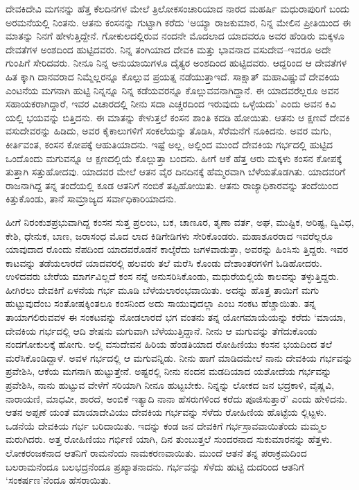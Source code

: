 ದೇವಕಿದೇವಿ ಮಗನನ್ನು ಹೆತ್ತ ಕೆಲದಿನಗಳ ಮೇಲೆ ತ್ರಿಲೋಕಸಂಚಾರಿಯಾದ ನಾರದ ಮಹರ್ಷಿ ಮಧುರಾಪುರಿಗೆ ಬಂದು ಅರಮನೆಯಲ್ಲಿ ನಿಂತನು. ಆತನು ಕಂಸನನ್ನು ಗುಟ್ಟಾಗಿ ಕರೆದು ‘ಅಯ್ಯಾ ರಾಜಕುಮಾರ, ನಿನ್ನ ಮೇಲಿನ ಪ್ರೀತಿಯಿಂದ ಈ ಮಾತನ್ನು ನಿನಗೆ ಹೇಳುತ್ತಿದ್ದೇನೆ. ಗೋಕುಲದಲ್ಲಿರುವ ನಂದನೇ ಮೊದಲಾದ ಯಾದವರೂ ಅವರ ಹೆಂಡಿರು ಮಕ್ಕಳೂ ದೇವತೆಗಳ ಅಂಶದಿಂದ ಹುಟ್ಟಿದವರು. ನಿನ್ನ ತಂಗಿಯಾದ ದೇವಕಿ ಮತ್ತು ಭಾವನಾದ ವಸುದೇವ–ಇವರೂ ಅದೇ ಗುಂಪಿಗೆ ಸೇರಿದವರು. ನೀನೂ ನಿನ್ನ ಅನುಯಾಯಿಗಳೂ ದೈತ್ಯರ ಅಂಶದಿಂದ ಹುಟ್ಟಿದವರು. ಆದ್ದರಿಂದ ಆ ದೇವತೆಗಳ ಹಿತ ಕ್ಕಾಗಿ ದಾನವರಾದ ನಿಮ್ಮೆಲ್ಲರನ್ನೂ ಕೊಲ್ಲುವ ಪ್ರಯತ್ನ ನಡೆಯುತ್ತಾಇದೆ. ಸಾಕ್ಷಾತ್ ಮಹಾವಿಷ್ಣುವೆ ದೇವಕಿಯ ಎಂಟನೆಯ ಮಗನಾಗಿ ಹುಟ್ಟಿ ನಿನ್ನನ್ನೂ ನಿನ್ನ ಕಡೆಯವರನ್ನೂ ಕೊಲ್ಲುವವನಾಗಿದ್ದಾನೆ. ಈ ಯಾದವರೆಲ್ಲರೂ ಅವನ ಸಹಾಯಕರಾಗಿದ್ದಾರೆ, ಇವರ ವಿಚಾರದಲ್ಲಿ ನೀನು ಸದಾ ಎಚ್ಚರದಿಂದ ಇರುವುದು ಒಳ್ಳೆಯದು’ ಎಂದು ಅವನ ಕಿವಿ ಯಲ್ಲಿ ಭಯವನ್ನು ಬಿತ್ತಿದನು. ಈ ಮಾತನ್ನು ಕೇಳುತ್ತಲೆ ಕಂಸನ ಶಾಂತಿ ಕದಡಿ ಹೋಯಿತು. ಆತನು ಆ ಕ್ಷಣವೆ ದೇವಕಿ ವಸುದೇವರನ್ನು ಹಿಡಿದು, ಅವರ ಕೈಕಾಲುಗಳಿಗೆ ಸಂಕಲೆಯನ್ನು ತೊಡಿಸಿ, ಸೆರೆಮನೆಗೆ ನೂಕಿದನು. ಅವರ ಮಗು, ಕೀರ್ತಿವಂತ, ಕಂಸನ ಕೋಪಕ್ಕೆ ಆಹುತಿಯಾದನು. ಇಷ್ಟೆ ಅಲ್ಲ, ಅಲ್ಲಿಂದ ಮುಂದೆ ದೇವಕಿಯ ಗರ್ಭದಲ್ಲಿ ಹುಟ್ಟಿದ ಒಂದೊಂದು ಮಗುವನ್ನೂ ಆ ಕ್ಷಣದಲ್ಲಿಯೆ ಕೊಲ್ಲುತ್ತಾ ಬಂದನು. ಹೀಗೆ ಆಕೆ ಹೆತ್ತ ಆರು ಮಕ್ಕಳು ಕಂಸನ ಕೋಪಕ್ಕೆ ತುತ್ತಾಗಿ ಸತ್ತುಹೋದವು. ಯಾದವರ ಮೇಲೆ ಆತನ ವೈರ ದಿನದಿನಕ್ಕೆ ಹೆಮ್ಮರವಾಗಿ ಬೆಳೆಯತೊಡಗಿತು. ಯಾದವರಿಗೆ ರಾಜನಾಗಿದ್ದ ತನ್ನ ತಂದೆಯಲ್ಲಿ ಕೂಡ ಆತನಿಗೆ ನಂಬಿಕೆ ತಪ್ಪಿಹೋಯಿತು. ಆತನು ರಾಜ್ಯಾಧಿಕಾರವನ್ನು ತಂದೆಯಿಂದ ಕಿತ್ತುಕೊಂಡು, ತಾನೆ ಸಾಮ್ರಾಜ್ಯದ ಸರ್ವಾಧಿಕಾರಿಯಾದನು. 

ಹೀಗೆ ನಿರಂಕುಶಪ್ರಭುವಾಗಿದ್ದ ಕಂಸನ ಸುತ್ತ ಪ್ರಲಂಬ, ಬಕ, ಚಾಣೂರ, ತೃಣಾ ವರ್ತ, ಅಘ, ಮುಷ್ಟಿಕ, ಅರಿಷ್ಟ, ದ್ವಿವಿಧ, ಕೇಶಿ, ಧೇನುಕ, ಬಾಣ, ಜರಾಸಂಧ ಮೊದ ಲಾದ ಕಿಡಿಗೇಡಿಗಳು ಸೇರಿಕೊಂಡರು. ಮಹಾಶೂರರಾದ ಇವರೆಲ್ಲರೂ ಯಾವುದಾದ ರೊಂದು ನೆಪದಿಂದ ಯಾದವರೊಡನೆ ಕಾಲ್ಕೆರೆದು ಜಗಳವಾಡುತ್ತಾ, ಅವರನ್ನು ಹಿಂಸಿಸು ತ್ತಿದ್ದರು. ಇವರ ಕಾಟವನ್ನು ತಡೆಯಲಾರದೆ ಯಾದವರಲ್ಲಿ ಹಲವರು ತಲೆ ಮರೆಸಿ ಕೊಂಡು ದೇಶಾಂತರಗಳಿಗೆ ಓಡಿಹೋದರು. ಉಳಿದವರು ಬೇರೆಯ ಮಾರ್ಗವಿಲ್ಲದೆ ಕಂಸ ನನ್ನೆ ಅನುಸರಿಸಿಕೊಂಡು, ಮಧುರೆಯಲ್ಲಿಯೆ ಕಾಲವನ್ನು ತಳ್ಳುತ್ತಿದ್ದರು. ಹೀಗಿರಲು ದೇವಕಿಗೆ ಏಳನೆಯ ಗರ್ಭ ಮೂಡಿ ಬೆಳೆಯಲಾರಂಭವಾಯಿತು. ಅದನ್ನು ಹೊತ್ತ ತಾಯಿಗೆ ಮಗು ಹುಟ್ಟುವುದೆಂಬ ಸಂತೋಷಕ್ಕಿಂತಲೂ ಕಂಸನಿಂದ ಅದು ಸಾಯುವುದಲ್ಲಾ ಎಂಬ ಸಂಕಟ ಹೆಚ್ಚಾಯಿತು. ತನ್ನ ತಾಯಾಗಲಿರುವವಳ ಈ ಸಂಕಟವನ್ನು ನೋಡಲಾರದೆ ಭಗ ವಂತನು ತನ್ನ ಯೋಗಮಾಯೆಯನ್ನು ಕರೆದು ‘ಮಾಯಾ, ದೇವಕಿಯ ಗರ್ಭದಲ್ಲಿ ಆದಿ ಶೇಷನು ಮಗುವಾಗಿ ಬೆಳೆಯುತ್ತಿದ್ದಾನೆ. ನೀನು ಆ ಮಗುವನ್ನು ತೆಗೆದುಕೊಂಡು ನಂದಗೋಕುಲಕ್ಕೆ ಹೋಗು. ಅಲ್ಲಿ ವಸುದೇವನ ಹಿರಿಯ ಹೆಂಡತಿಯಾದ ರೋಹಿಣಿಯು ಕಂಸನ ಭಯದಿಂದ ತಲೆ ಮರೆಸಿಕೊಂಡಿದ್ದಾಳೆ. ಅವಳ ಗರ್ಭದಲ್ಲಿ ಆ ಮಗುವನ್ನಿಡು. ನೀನು ಹಾಗೆ ಮಾಡಿದಮೇಲೆ ನಾನು ದೇವಕಿಯ ಗರ್ಭವನ್ನು ಪ್ರವೇಶಿಸಿ, ಆಕೆಯ ಮಗನಾಗಿ ಹುಟ್ಟುತ್ತೇನೆ. ಅಷ್ಟರಲ್ಲಿ ನೀನು ನಂದನ ಮಡದಿಯಾದ ಯಶೋದೆಯ ಗರ್ಭವನ್ನು ಪ್ರವೇಶಿಸಿ, ನಾನು ಹುಟ್ಟುವ ವೇಳೆಗೆ ಸರಿಯಾಗಿ ನೀನೂ ಹುಟ್ಟಬೇಕು. ನಿನ್ನನ್ನು ಲೋಕದ ಜನ ಭದ್ರಕಾಳಿ, ವೈಷ್ಣವಿ, ನಾರಾಯಣಿ, ಮಾಧವೀ, ಶಾರದೆ, ಅಂಬಿಕೆ ಇತ್ಯಾದಿ ನಾನಾ ಹೆಸರುಗಳಿಂದ ಕರೆದು ಪೂಜಿಸುತ್ತಾರೆ’ ಎಂದು ಹೇಳಿದನು. ಆತನ ಅಪ್ಪಣೆ ಯಂತೆ ಮಾಯಾದೇವಿಯು ದೇವಕಿಯ ಗರ್ಭವನ್ನು ಸೆಳೆದು ರೋಹಿಣಿಯ ಹೊಟ್ಟೆಯ ಲ್ಲಿಟ್ಟಳು. ಒಡನೆಯೆ ದೇವಕಿಯ ಗರ್ಭ ಬರಿದಾಯಿತು. ಇದನ್ನು ಕಂಡ ಜನ ದೇವಕಿಗೆ ಗರ್ಭಸ್ರಾವವಾಯಿತೆಂದು ಮಮ್ಮಲ ಮರುಗಿದರು. ಅತ್ತ ರೋಹಿಣಿಯು ಗರ್ಭಿಣಿ ಯಾಗಿ, ದಿನ ತುಂಬುತ್ತಲೆ ಸುಂದರನಾದ ಸುಕುಮಾರನನ್ನು ಹೆತ್ತಳು. ಲೋಕರಂಜಕನಾದ ಆತನಿಗೆ ರಾಮನೆಂದು ನಾಮಕರಣವಾಯಿತು. ಮುಂದೆ ಆತನೆ ತನ್ನ ಪರಾಕ್ರಮದಿಂದ ಬಲರಾಮನೆಂದೂ ಬಲಭದ್ರನೆಂದೂ ಪ್ರಖ್ಯಾತನಾದನು. ಗರ್ಭವನ್ನು ಸೆಳೆದು ಹುಟ್ಟಿ ದುದರಿಂದ ಆತನಿಗೆ ‘ಸಂಕರ್ಷಣ’ನೆಂದೂ ಹೆಸರಾಯಿತು.

